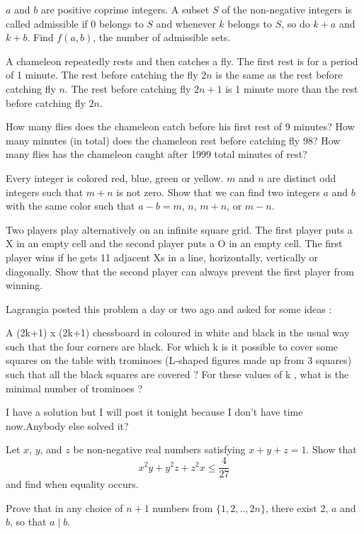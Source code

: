 \bq{}{}
$a$ and $b$ are positive coprime integers. A subset $S$ of the non-negative integers is called admissible if $0$ belongs to $S$ and whenever $k$ belongs to $S$, so do $k + a$ and $k + b$. Find $f(a, b)$, the number of admissible sets.
\eq

A chameleon repeatedly rests and then catches a fly. The first rest is for a period of 1 minute. The rest before catching the fly $2n$ is the same as the rest before catching fly $n$. The rest before catching fly $2n+1$ is 1 minute more than the rest before catching fly $2n$.

How many flies does the chameleon catch before his first rest of 9 minutes?
How many minutes (in total) does the chameleon rest before catching fly 98?
How many flies has the chameleon caught after 1999 total minutes of rest?
\eq

Every integer is colored red, blue, green or yellow. $m$ and $n$ are distinct odd integers such that $m + n$ is not zero. Show that we can find two integers $a$ and $b$ with the same color such that $a - b = m$, $n$, $m + n$, or $m - n$.
\eq

Two players play alternatively on an infinite square grid. The first player puts a X in an empty cell and the second player puts a O in an empty cell. The first player wins if he gets 11 adjacent Xs in a line, horizontally, vertically or diagonally. Show that the second player can always prevent the first player from winning.
\eq

\bq{}{}
Lagrangia posted this problem a day or two ago and asked for some ideas :

A (2k+1) x (2k+1) chessboard in coloured in white and black in the usual way such that the four corners are black. For which k is it possible to cover some squares on the table with trominoes (L-shaped figures made up from 3 squares) such that all the black squares are covered ? For these values of k , what is the minimal number of trominoes ?

I have a solution but I will post it tonight because I don't have time now.Anybody else solved it?
\eq

Let $ x$, $ y$, and $ z$ be non-negative real numbers satisfying $ x + y + z = 1$. Show that
\[ x^2 y + y^2 z + z^2 x \leq \frac {4}{27} \]
and find when equality occurs.
\eq

\bq{}{}
Prove that in any choice of $n+1$ numbers from $\{1,2,..,2n\}$, there exist 2, $a$ and $b$, so that $a \mid b$.
\eq

